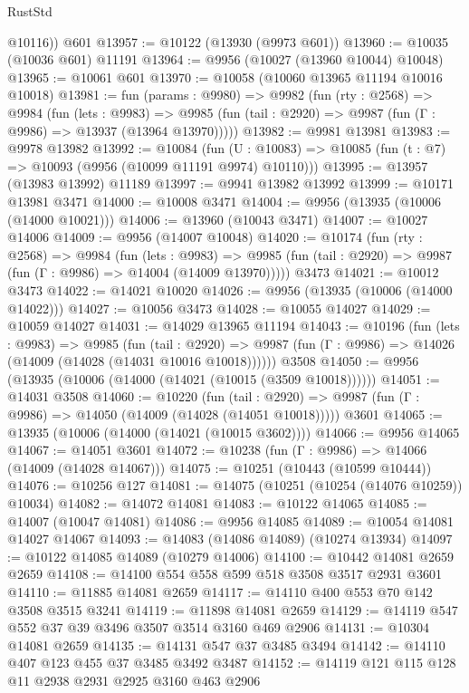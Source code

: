 \begin{lexlean}{RustStd}
\begin{coremodule}
        @10116))
    @601
@13957 := @10122 (@13930 (@9973 @601))
@13960 := @10035 (@10036 @601) @11191
@13964 := @9956 (@10027 (@13960 @10044) @10048)
@13965 := @10061 @601
@13970 := @10058 (@10060 @13965 @11194 @10016 @10018)
@13981 := fun (params : @9980) =>
  @9982
    (fun (rty : @2568) =>
    @9984
      (fun (lets : @9983) =>
      @9985 (fun (tail : @2920) => @9987 (fun (Γ : @9986) => @13937 (@13964 @13970)))))
@13982 := @9981 @13981
@13983 := @9978 @13982
@13992 := @10084
    (fun (U : @10083) => @10085 (fun (t : @7) => @10093 (@9956 (@10099 @11191 @9974) @10110)))
@13995 := @13957 (@13983 @13992) @11189
@13997 := @9941 @13982 @13992
@13999 := @10171 @13981 @3471
@14000 := @10008 @3471
@14004 := @9956 (@13935 (@10006 (@14000 @10021)))
@14006 := @13960 (@10043 @3471)
@14007 := @10027 @14006
@14009 := @9956 (@14007 @10048)
@14020 := @10174
    (fun (rty : @2568) =>
    @9984
      (fun (lets : @9983) =>
      @9985 (fun (tail : @2920) => @9987 (fun (Γ : @9986) => @14004 (@14009 @13970)))))
    @3473
@14021 := @10012 @3473
@14022 := @14021 @10020
@14026 := @9956 (@13935 (@10006 (@14000 @14022)))
@14027 := @10056 @3473
@14028 := @10055 @14027
@14029 := @10059 @14027
@14031 := @14029 @13965 @11194
@14043 := @10196
    (fun (lets : @9983) =>
    @9985
      (fun (tail : @2920) =>
      @9987 (fun (Γ : @9986) => @14026 (@14009 (@14028 (@14031 @10016 @10018))))))
    @3508
@14050 := @9956 (@13935 (@10006 (@14000 (@14021 (@10015 (@3509 @10018))))))
@14051 := @14031 @3508
@14060 := @10220
    (fun (tail : @2920) => @9987 (fun (Γ : @9986) => @14050 (@14009 (@14028 (@14051 @10018)))))
    @3601
@14065 := @13935 (@10006 (@14000 (@14021 (@10015 @3602))))
@14066 := @9956 @14065
@14067 := @14051 @3601
@14072 := @10238 (fun (Γ : @9986) => @14066 (@14009 (@14028 @14067)))
@14075 := @10251 (@10443 (@10599 @10444))
@14076 := @10256 @127
@14081 := @14075 (@10251 (@10254 (@14076 @10259)) @10034)
@14082 := @14072 @14081
@14083 := @10122 @14065
@14085 := @14007 (@10047 @14081)
@14086 := @9956 @14085
@14089 := @10054 @14081 @14027 @14067
@14093 := @14083 (@14086 @14089) (@10274 @13934)
@14097 := @10122 @14085 @14089 (@10279 @14006)
@14100 := @10442 @14081 @2659 @2659
@14108 := @14100 @554 @558 @599 @518 @3508 @3517 @2931 @3601
@14110 := @11885 @14081 @2659
@14117 := @14110 @400 @553 @70 @142 @3508 @3515 @3241
@14119 := @11898 @14081 @2659
@14129 := @14119 @547 @552 @37 @39 @3496 @3507 @3514 @3160 @469 @2906
@14131 := @10304 @14081 @2659
@14135 := @14131 @547 @37 @3485 @3494
@14142 := @14110 @407 @123 @455 @37 @3485 @3492 @3487
@14152 := @14119 @121 @115 @128 @11 @2938 @2931 @2925 @3160 @463 @2906

\end{coremodule}
\end{lexlean}

